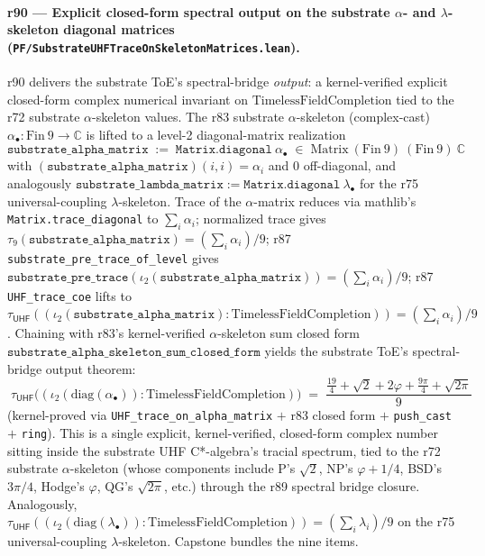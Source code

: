 \documentclass[11pt,a4paper]{amsart}
\theoremstyle{plain}
\theoremstyle{definition}
\begin{document}
\paragraph{r90 --- Explicit closed-form spectral output on the substrate $\alpha$- and $\lambda$-skeleton diagonal matrices (\texttt{PF/SubstrateUHFTraceOnSkeletonMatrices.lean}).} r90 delivers the substrate ToE's spectral-bridge \emph{output}: a kernel-verified explicit closed-form complex numerical invariant on $\mathrm{TimelessFieldCompletion}$ tied to the r72 substrate $\alpha$-skeleton values. The r83 substrate $\alpha$-skeleton (complex-cast) $\alpha_\bullet \colon \mathrm{Fin}~9 \to \mathbb{C}$ is lifted to a level-2 diagonal-matrix realization
\[
\mathtt{substrate\_alpha\_matrix} \;:=\; \mathtt{Matrix.diagonal}~\alpha_\bullet \;\in\; \mathrm{Matrix}~(\mathrm{Fin}~9)~(\mathrm{Fin}~9)~\mathbb{C}
\]
with $(\mathtt{substrate\_alpha\_matrix})(i,i) = \alpha_i$ and $0$ off-diagonal, and analogously $\mathtt{substrate\_lambda\_matrix} := \mathtt{Matrix.diagonal}~\lambda_\bullet$ for the r75 universal-coupling $\lambda$-skeleton. Trace of the $\alpha$-matrix reduces via mathlib's \texttt{Matrix.trace\_diagonal} to $\sum_i \alpha_i$; normalized trace gives $\tau_9(\mathtt{substrate\_alpha\_matrix}) = (\sum_i \alpha_i)/9$; r87 \texttt{substrate\_pre\_trace\_of\_level} gives $\mathtt{substrate\_pre\_trace}(\iota_2(\mathtt{substrate\_alpha\_matrix})) = (\sum_i \alpha_i)/9$; r87 \texttt{UHF\_trace\_coe} lifts to $\tau_{\textsf{UHF}}((\iota_2(\mathtt{substrate\_alpha\_matrix}) : \mathrm{TimelessFieldCompletion})) = (\sum_i \alpha_i)/9$. Chaining with r83's kernel-verified $\alpha$-skeleton sum closed form $\mathtt{substrate\_alpha\_skeleton\_sum\_closed\_form}$ yields the substrate ToE's spectral-bridge output theorem:
\[
\boxed{\; \tau_{\textsf{UHF}}\bigl((\iota_2(\mathrm{diag}(\alpha_\bullet)) : \mathrm{TimelessFieldCompletion})\bigr) \;=\; \frac{\tfrac{19}{4} + \sqrt{2} + 2\varphi + \tfrac{9\pi}{4} + \sqrt{2\pi}}{9} \;}
\]
(kernel-proved via \texttt{UHF\_trace\_on\_alpha\_matrix} $+$ r83 closed form $+$ \texttt{push\_cast} $+$ \texttt{ring}). This is a single explicit, kernel-verified, closed-form complex number sitting inside the substrate UHF C*-algebra's tracial spectrum, tied to the r72 substrate $\alpha$-skeleton (whose components include P's $\sqrt{2}$, NP's $\varphi + 1/4$, BSD's $3\pi/4$, Hodge's $\varphi$, QG's $\sqrt{2\pi}$, etc.) through the r89 spectral bridge closure. Analogously, $\tau_{\textsf{UHF}}((\iota_2(\mathrm{diag}(\lambda_\bullet)) : \mathrm{TimelessFieldCompletion})) = (\sum_i \lambda_i)/9$ on the r75 universal-coupling $\lambda$-skeleton. Capstone  bundles the nine items.
\end{document}

